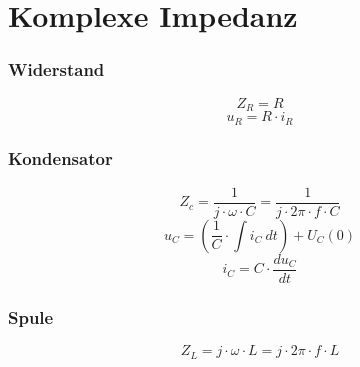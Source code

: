 



\section{Komplexe Impedanz}

\subsubsection{Widerstand}
\[ Z_R = R \]
\[ u_R = R \cdot i_R \]

\subsubsection{Kondensator}
\[ Z_c = \frac{1}{j \cdot \omega \cdot C} = \frac{1}{j \cdot 2 \pi \cdot f \cdot C} \]
\[ u_C = \left( \frac{1}{C} \cdot \int i_C ~ dt \right) + U_C(0) \]
\[ i_C = C \cdot \frac{du_C}{dt} \]

\subsubsection{Spule}
\[ Z_L = j \cdot \omega \cdot L = j \cdot 2 \pi \cdot f \cdot L \]
